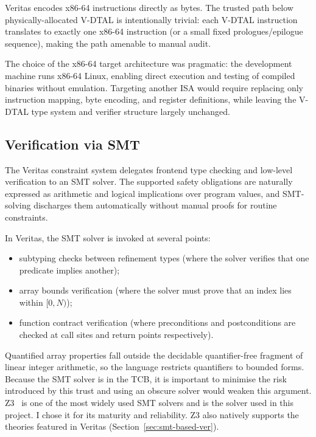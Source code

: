 Veritas encodes x86-64 instructions directly as bytes. The trusted path below physically-allocated V-DTAL is intentionally trivial: each V-DTAL instruction translates to exactly one x86-64 instruction (or a small fixed prologues/epilogue sequence), making the path amenable to manual audit.

The choice of the x86-64 target architecture was pragmatic: the development machine runs x86-64 Linux, enabling direct execution and testing of compiled binaries without emulation. Targeting another ISA would require replacing only instruction mapping, byte encoding, and register definitions, while leaving the V-DTAL type system and verifier structure largely unchanged.

\subsection{Verification via SMT}

The Veritas constraint system delegates frontend type checking and low-level verification to an SMT solver. The supported safety obligations are naturally expressed as arithmetic and logical implications over program values, and SMT-solving discharges them automatically without manual proofs for routine constraints.

In Veritas, the SMT solver is invoked at several points:
\begin{itemize}
  \item subtyping checks between refinement types (where the solver verifies that one predicate implies another);
  \item array bounds verification (where the solver must prove that an index lies within $[0, N)$);
  \item function contract verification (where preconditions and postconditions are checked at call sites and return points respectively).
\end{itemize}

Quantified array properties fall outside the decidable quantifier-free fragment of linear integer arithmetic, so the language restricts quantifiers to bounded forms. Because the SMT solver is in the TCB, it is important to minimise the risk introduced by this trust and using an obscure solver would weaken this argument. Z3~\cite{DeMoura2008Z3} is one of the most widely used SMT solvers and is the solver used in this project. I chose it for its maturity and reliability. Z3 also natively supports the theories featured in Veritas (Section~\ref{sec:smt-based-ver}).

